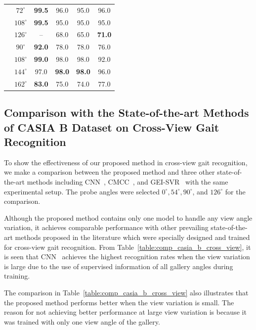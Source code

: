 \begin{table}
{\begin{tabular*}{29pc}{cccccc}
		&$72^{\circ}$ &\textbf{99.5} &96.0 &95.0 &96.0 \\ \rule{0pt}{2ex}
	
		&$108^{\circ}$ &\textbf{99.5} &95.0 &95.0 &95.0 \\ \rule{0pt}{2ex}
	
		&$126^{\circ}$ &-- &68.0 &65.0 &\textbf{71.0} \\\hline\rule{0pt}{3ex}
	
	
	\multirow{4}{*}{$126^{\circ}$} &$90^{\circ}$ &\textbf{92.0} &78.0 &78.0 &76.0 \\\rule{0pt}{2ex}
			&$108^{\circ}$ &\textbf{99.0} &98.0 &98.0 &92.0 \\\rule{0pt}{2ex}
			&$144^{\circ}$ &97.0 &\textbf{98.0} &\textbf{98.0} &96.0 \\\rule{0pt}{2ex}
			&$162^{\circ}$ &\textbf{83.0} &75.0 &74.0 &77.0 \\\hline
	\end{tabular*}}{} 
\end{table}

\subsection{Comparison with the State-of-the-art Methods of CASIA B Dataset on Cross-View Gait Recognition}
To show the effectiveness of our proposed method in cross-view gait recognition, we make a comparison between the proposed method and three other state-of-the-art methods including CNN~\cite{Wu_17}, CMCC~\cite{Kusakunniran_14}, and GEI-SVR~\cite{Kusakunniran_10} with the same experimental setup. The probe angles were selected $0^{\circ}, 54^{\circ}, 90^{\circ}$, and $126^{\circ}$ for the comparison. 

Although the proposed method contains only one model to handle any view angle variation, it achieves comparable performance with other prevailing state-of-the-art methods proposed in the literature which were specially designed and trained for cross-view gait recognition. From Table~\ref{table:comp_casia_b_cross_view}, it is seen that CNN~\cite{Wu_17} achieves the highest recognition rates when the view variation is large due to the use of supervised information of all gallery angles during training.

The comparison in Table~\ref{table:comp_casia_b_cross_view} also illustrates that the proposed method performs better when the view variation is small. The reason for not achieving better performance at large view variation is because it was trained with only one view angle of the gallery. 


